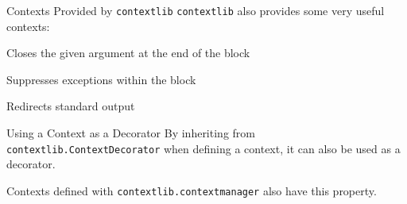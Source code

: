 \begin{frame}{Contexts Provided by \texttt{contextlib}}
  \texttt{contextlib} also provides some very useful contexts:
  \begin{description}[<+->]
    \item[\texttt{closing}] Closes the given argument at the end of the block
    \item[\texttt{suppress}] Suppresses exceptions within the block
    \item[\texttt{redirect\_stdout}] Redirects standard output
  \end{description}
\end{frame}

\begin{frame}{Using a Context as a Decorator}
  By inheriting from \texttt{contextlib.ContextDecorator} when defining a context, it can also be used as a decorator.

  Contexts defined with \texttt{contextlib.contextmanager} also have this
  property.
\end{frame}